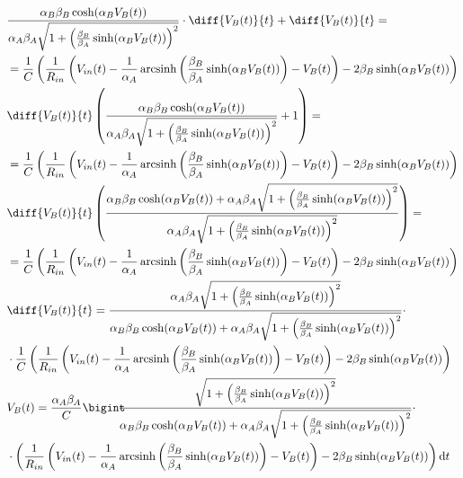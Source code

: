 	\begin{equation}
		\label{eq:sostituzione}
		\begin{split}
			&\frac{\alpha_{B}\beta_{B}\cosh(\alpha_{B}V_{B}(t))}{\alpha_{A}\beta_{A}\sqrt{1+\left(\frac{\beta_{B}}{\beta_{A}}\sinh(\alpha_{B}V_{B}(t))\right)^{2}}}\cdot\diff{V_{B}(t)}{t}+\diff{V_{B}(t)}{t} =\\&= \frac{1}{C}\left(\frac{1}{R_{in}}\left(V_{in}(t)-\frac{1}{\alpha_{A}} \arcsinh \left(\frac{\beta_{B}}{\beta_{A}} \sinh(\alpha_{B}V_{B}(t))\right)-V_{B}(t)\right)-2\beta_{B}\sinh(\alpha_{B}V_{B}(t))\right)\\
			&\diff{V_{B}(t)}{t}\left(\frac{\alpha_{B}\beta_{B}\cosh(\alpha_{B}V_{B}(t))}{\alpha_{A}\beta_{A}\sqrt{1+\left(\frac{\beta_{B}}{\beta_{A}}\sinh(\alpha_{B}V_{B}(t))\right)^{2}}}+1\right) =\\&= \frac{1}{C}\left(\frac{1}{R_{in}}\left(V_{in}(t)-\frac{1}{\alpha_{A}} \arcsinh \left(\frac{\beta_{B}}{\beta_{A}} \sinh(\alpha_{B}V_{B}(t))\right)-V_{B}(t)\right)-2\beta_{B}\sinh(\alpha_{B}V_{B}(t))\right)\\
			&\diff{V_{B}(t)}{t}\left(\frac{\alpha_{B}\beta_{B}\cosh(\alpha_{B}V_{B}(t))+\alpha_{A}\beta_{A}\sqrt{1+\left(\frac{\beta_{B}}{\beta_{A}}\sinh(\alpha_{B}V_{B}(t))\right)^{2}}}{\alpha_{A}\beta_{A}\sqrt{1+\left(\frac{\beta_{B}}{\beta_{A}}\sinh(\alpha_{B}V_{B}(t))\right)^{2}}}\right) =\\&= \frac{1}{C}\left(\frac{1}{R_{in}}\left(V_{in}(t)-\frac{1}{\alpha_{A}} \arcsinh \left(\frac{\beta_{B}}{\beta_{A}} \sinh(\alpha_{B}V_{B}(t))\right)-V_{B}(t)\right)-2\beta_{B}\sinh(\alpha_{B}V_{B}(t))\right)\\
			&\diff{V_{B}(t)}{t} = \frac{\alpha_{A}\beta_{A}\sqrt{1+\left(\frac{\beta_{B}}{\beta_{A}}\sinh(\alpha_{B}V_{B}(t))\right)^{2}}}{\alpha_{B}\beta_{B}\cosh(\alpha_{B}V_{B}(t))+\alpha_{A}\beta_{A}\sqrt{1+\left(\frac{\beta_{B}}{\beta_{A}}\sinh(\alpha_{B}V_{B}(t))\right)^{2}}}\cdot\\&\cdot\frac{1}{C}\left(\frac{1}{R_{in}}\left(V_{in}(t)-\frac{1}{\alpha_{A}} \arcsinh \left(\frac{\beta_{B}}{\beta_{A}} \sinh(\alpha_{B}V_{B}(t))\right)-V_{B}(t)\right)-2\beta_{B}\sinh(\alpha_{B}V_{B}(t))\right)\\
			&V_{B}(t) = \frac{\alpha_{A}\beta_{A}}{C}\Int{\frac{\sqrt{1+\left(\frac{\beta_{B}}{\beta_{A}}\sinh(\alpha_{B}V_{B}(t))\right)^{2}}}{\alpha_{B}\beta_{B}\cosh(\alpha_{B}V_{B}(t))+\alpha_{A}\beta_{A}\sqrt{1+\left(\frac{\beta_{B}}{\beta_{A}}\sinh(\alpha_{B}V_{B}(t))\right)^{2}}}\cdot\\&\cdot\left(\frac{1}{R_{in}}\left(V_{in}(t)-\frac{1}{\alpha_{A}} \arcsinh \left(\frac{\beta_{B}}{\beta_{A}} \sinh(\alpha_{B}V_{B}(t))\right)-V_{B}(t)\right)-2\beta_{B}\sinh(\alpha_{B}V_{B}(t))\right)}{t}\\
		\end{split}
	\end{equation}
	
